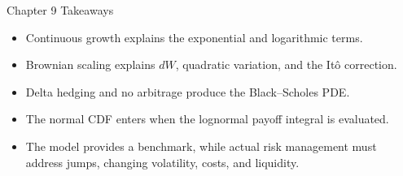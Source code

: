 \documentclass[aspectratio=169]{beamer}
\begin{document}
\begin{frame}[t]{Chapter 9 Takeaways}
\justifying
\begin{itemize}
\item Continuous growth explains the exponential and logarithmic terms.
\item Brownian scaling explains $dW$, quadratic variation, and the It\^o correction.
\item Delta hedging and no arbitrage produce the Black--Scholes PDE.
\item The normal CDF enters when the lognormal payoff integral is evaluated.
\item The model provides a benchmark, while actual risk management must address jumps, changing volatility, costs, and liquidity.
\end{itemize}
\end{frame}
\end{document}
